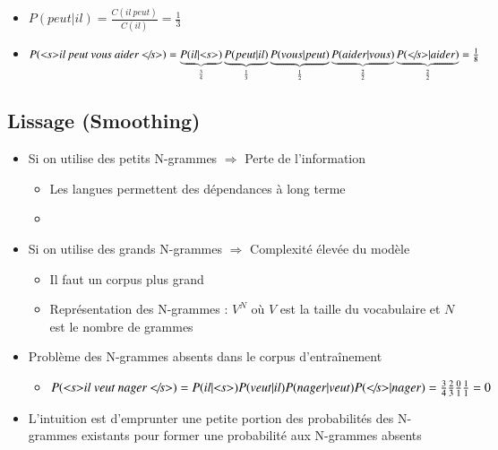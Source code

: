 \documentclass{KodeBook}
\begin{document}
\begin{itemize}
	\item $P(peut | il) = \frac{C(il\ peut)}{C(il)} = \frac{1}{3}$
	\item $P(\text{\textit{\textless s\textgreater il peut vous aider \textless/s\textgreater}}) = 
	\underbrace{P(il|\text{\textit{\textless s\textgreater}})}_{\frac{3}{4}}
	\underbrace{P(peut|il)}_{\frac{1}{3}} 
	\underbrace{P(vous|peut)}_{\frac{1}{2}} 
	\underbrace{P(aider|vous)}_{\frac{2}{2}}
	\underbrace{P(\text{\textit{\textless/s\textgreater}}|aider)}_{\frac{2}{2}} = 
	\frac{1}{8}
	$
\end{itemize}

\subsection{Lissage (Smoothing)}

\begin{itemize}
	
	\item Si on utilise des petits N-grammes $ \Longrightarrow $ Perte de l'information
	\begin{itemize}
		\item Les langues permettent des dépendances à long terme
		\item {}
	\end{itemize}
	
	\item Si on utilise des grands N-grammes $ \Longrightarrow $ Complexité élevée du modèle
	\begin{itemize}
		\item Il faut un corpus plus grand
		\item Représentation des N-grammes : $V^N$ où $V$ est la taille du vocabulaire et $N$ est le nombre de grammes
	\end{itemize}
	
	\item Problème des N-grammes absents dans le corpus d'entraînement
	\begin{itemize}
		\item $P(\text{\textit{\textless s\textgreater il veut nager \textless/s\textgreater}}) = 
		P(il|\text{\textit{\textless s\textgreater}}) P(veut|il) P(nager|veut)  P(\text{\textit{\textless/s\textgreater}}|nager) = 
		\frac{3}{4} \frac{2}{3} \frac{0}{1} \frac{1}{1} = 0
		$
	\end{itemize}
	\item L'intuition est d'emprunter une petite portion des probabilités des N-grammes existants pour former une probabilité aux N-grammes absents 
\end{itemize}
\end{document}
